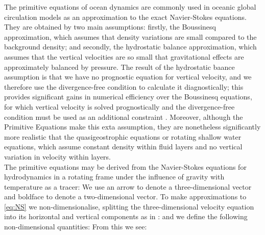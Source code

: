 The primitive equations of ocean dynamics are commonly used in oceanic global circulation models as an approximation to the exact Navier-Stokes equations. They are obtained by two main assumptions: firstly, the Boussinesq approximation, which assumes that density variations are small compared to the background density; and secondly, the hydrostatic balance approximation, which assumes that the vertical velocities are so small that gravitational effects are approximately balanced by pressure. The result of the hydrostatic baance assumption is that we have no prognostic equation for vertical velocity, and we therefore use the divergence-free condition to calculate it diagnostically; this provides significant gains in numerical efficiency over the Boussinesq equations, for which vertical velocity is solved prognostically and the divergence-free condition must be used as an additional constraint \cite{adcroft_2004}. Moreover, although the Primitive Equations make this exta assumption, they are nonetheless significantly more realistic that the quasigeostrophic equations or rotating shallow water equations, which assume constant density within fluid layers and no vertical variation in velocity within layers. \\
\indnt The primitive equations may be derived from the Navier-Stokes equations for hydrodynamics in a rotating frame under the influence of gravity with temperature as a tracer:
We use an arrow to denote a three-dimensional vector and boldface to denote a two-dimensional vector. To make approximations to \cref{eq:NS} we non-dimensionalise, splitting the three-dimensional velocity equation into its horizontal and vertical components as in \cite{holm_schmah_stoica_2011}:
and we define the following non-dimensional quantities:
From this we see:
